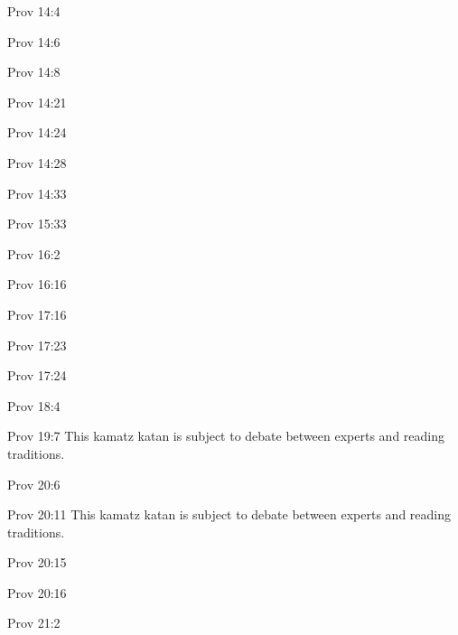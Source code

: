 \documentclass[14pt]{article}
\begin{document}
\begin{itemize}
{{{{{{{{{{{{{{\item Prov 14:4

\item Prov 14:6

\item Prov 14:8

\item Prov 14:21

\item Prov 14:24

\item Prov 14:28

\item Prov 14:33

\item Prov 15:33

\item Prov 16:2

\item Prov 16:16

\item Prov 17:16

\item Prov 17:23

\item Prov 17:24

\item Prov 18:4

\item Prov 19:7 This kamatz katan is subject to debate between experts and reading traditions.

\item Prov 20:6

\item Prov 20:11 This kamatz katan is subject to debate between experts and reading traditions.

\item Prov 20:15

\item Prov 20:16

\item Prov 21:2

}}}}}}}}}}}}}}
\end{itemize}
\end{document}
